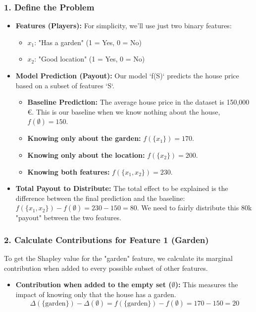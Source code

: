 \documentclass{article}
\begin{document}
\begin{multicols}{2}
\subsubsection{1. Define the Problem}
\begin{itemize}
    \item \textbf{Features (Players):} For simplicity, we'll use just two binary features:
    \begin{itemize}
        \item $x_{1}$: "Has a garden" (1 = Yes, 0 = No)
        \item $x_{2}$: "Good location" (1 = Yes, 0 = No)
    \end{itemize}
    \item \textbf{Model Prediction (Payout):} Our model `f(S)` predicts the house price based on a subset of features `S`.
    \begin{itemize}
        \item \textbf{Baseline Prediction:} The average house price in the dataset is 150,000 €. This is our baseline when we know nothing about the house, $f(\emptyset) = 150$.
        \item \textbf{Knowing only about the garden:} $f(\{x_{1}\}) = 170$.
        \item \textbf{Knowing only about the location:} $f(\{x_{2}\}) = 200$.
        \item \textbf{Knowing both features:} $f(\{x_{1}, x_{2}\}) = 230$.
    \end{itemize}
    \item \textbf{Total Payout to Distribute:} The total effect to be explained is the difference between the final prediction and the baseline: $f(\{x_{1}, x_{2}\}) - f(\emptyset) = 230 - 150 = 80$. We need to fairly distribute this 80k "payout" between the two features.
\end{itemize}

\subsubsection{2. Calculate Contributions for Feature 1 (Garden)}
To get the Shapley value for the "garden" feature, we calculate its marginal contribution when added to every possible subset of other features.
\begin{itemize}
    \item \textbf{Contribution when added to the empty set ($\emptyset$):}
    This measures the impact of knowing only that the house has a garden.
    $$\Delta(\{\text{garden}\}) - \Delta(\emptyset) = f(\{\text{garden}\}) - f(\emptyset) = 170 - 150 = 20$$


\end{itemize}
\end{multicols}
\end{document}
